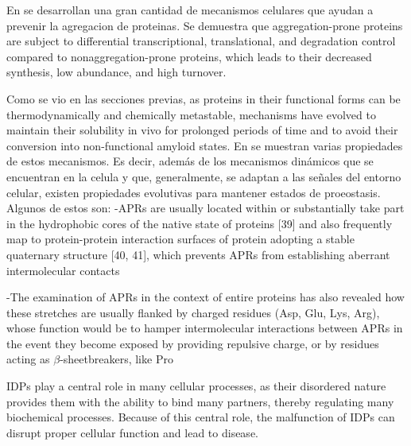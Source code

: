 En \cite{gsponer2012cellular} se desarrollan una gran cantidad de mecanismos celulares que ayudan a prevenir la agregacion de proteinas. 
Se demuestra que aggregation-prone proteins are subject to differential transcriptional, translational, and degradation control compared to nonaggregation-prone proteins, which leads to their decreased
synthesis, low abundance, and high turnover. 

Como se vio en las secciones previas, as proteins in their functional forms can be thermodynamically and chemically metastable, mechanisms have evolved to maintain their solubility in vivo for prolonged periods of
time and to avoid their conversion into non-functional amyloid states.
En \cite{knowles2014amyloid} se muestran varias propiedades de estos mecanismos. 
Es decir, además de los mecanismos dinámicos que se encuentran en la celula y que, generalmente, se adaptan a las señales del entorno celular, existen propiedades evolutivas para mantener estados de proeostasis.
Algunos de estos son:
-APRs are usually located within or substantially take part in the hydrophobic cores of the native state of proteins [39] and also frequently map to protein-protein interaction surfaces of protein adopting
a stable quaternary structure [40, 41], which prevents APRs from establishing aberrant intermolecular contacts

-The examination of APRs in the context of entire proteins has also revealed how these stretches are usually flanked by charged residues (Asp, Glu, Lys, Arg), whose
function would be to hamper intermolecular interactions between APRs in the event they become exposed by providing repulsive charge, or by residues acting as $\beta$-sheetbreakers, like Pro


IDPs play a central role in many cellular processes, as their disordered nature provides them with the ability to bind many partners, thereby regulating many biochemical
processes. Because of this central role, the malfunction of IDPs can disrupt proper cellular function and lead to disease.


